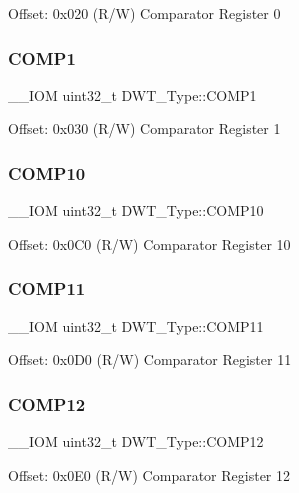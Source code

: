 Offset\+: 0x020 (R/W) Comparator Register 0 \mbox{\label{struct_d_w_t___type_a38714af6b7fa7c64d68f5e1efbe7a931}} 
\subsubsection{\texorpdfstring{COMP1}{COMP1}}
{\footnotesize\ttfamily \+\_\+\+\_\+\+I\+OM uint32\+\_\+t D\+W\+T\+\_\+\+Type\+::\+C\+O\+M\+P1}

Offset\+: 0x030 (R/W) Comparator Register 1 \mbox{\label{struct_d_w_t___type_acf26842434e5cd1487a49812ec842d03}} 
\subsubsection{\texorpdfstring{COMP10}{COMP10}}
{\footnotesize\ttfamily \+\_\+\+\_\+\+I\+OM uint32\+\_\+t D\+W\+T\+\_\+\+Type\+::\+C\+O\+M\+P10}

Offset\+: 0x0\+C0 (R/W) Comparator Register 10 \mbox{\label{struct_d_w_t___type_aa199b91c854edd21ded38b8922d1e2a7}} 
\subsubsection{\texorpdfstring{COMP11}{COMP11}}
{\footnotesize\ttfamily \+\_\+\+\_\+\+I\+OM uint32\+\_\+t D\+W\+T\+\_\+\+Type\+::\+C\+O\+M\+P11}

Offset\+: 0x0\+D0 (R/W) Comparator Register 11 \mbox{\label{struct_d_w_t___type_a9115fd187d8cbcb9d6ec5eba938b81ea}} 
\subsubsection{\texorpdfstring{COMP12}{COMP12}}
{\footnotesize\ttfamily \+\_\+\+\_\+\+I\+OM uint32\+\_\+t D\+W\+T\+\_\+\+Type\+::\+C\+O\+M\+P12}

Offset\+: 0x0\+E0 (R/W) Comparator Register 12 \mbox{\label{struct_d_w_t___type_abc29ac14df61ec3f8f3d28ca92892d8a}} 
